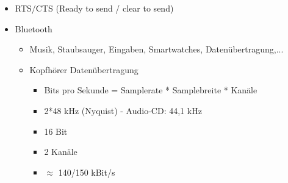 \documentclass{article} %
\begin{document}
\begin{itemize}
\begin{itemize}
		\end{itemize}
		\item RTS/CTS (Ready to send / clear to send)
		\item Bluetooth
		\begin{itemize}
			\item Musik, Staubsauger, Eingaben, Smartwatches, Datenübertragung,...
			\item Kopfhörer Datenübertragung
			\begin{itemize}
				\item Bits pro Sekunde = Samplerate * Samplebreite * Kanäle
				\item 2*48 kHz (Nyquist) - Audio-CD: 44,1 kHz
				\item 16 Bit
				\item 2 Kanäle
				\item $\approx$ 140/150 kBit/s
			\end{itemize}
		\end{itemize}
	\end{itemize}
	
	

\newpage
\begin{multicols}{2}
	\nocite{*}
	
	
\end{multicols}
\end{document}

